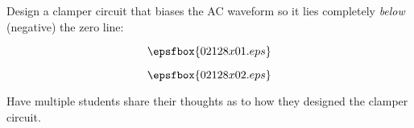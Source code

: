 

Design a clamper circuit that biases the AC waveform so it lies completely {\it below} (negative) the zero line:

$$\epsfbox{02128x01.eps}$$







$$\epsfbox{02128x02.eps}$$







Have multiple students share their thoughts as to how they designed the clamper circuit.




